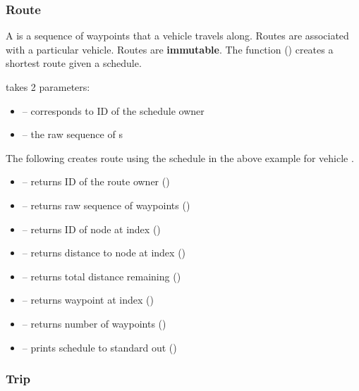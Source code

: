 \subsubsection{Route}

A  is a sequence of waypoints that a vehicle travels along.  Routes
are associated with a particular vehicle. Routes are \textbf{immutable}.  The
function  () creates a shortest
route given a schedule.

  takes 2 parameters:
\begin{itemize}
    \item[]  -- corresponds to ID of the schedule owner
    \item[]  -- the raw sequence of s
\end{itemize}

 The following creates route  using the schedule in the
above example for vehicle .

\begin{itemize}
    \item[]  -- returns ID of the route owner ()
    \item[]  -- returns raw sequence of waypoints ()
    \item[]  -- returns ID of node at index  ()
    \item[]  -- returns distance to node at index ()
    \item[]  -- returns total distance remaining ()
    \item[]  -- returns waypoint at index  ()
    \item[]  -- returns number of waypoints ()
    \item[]  -- prints schedule to standard out ()
\end{itemize}

\subsubsection{Trip}

